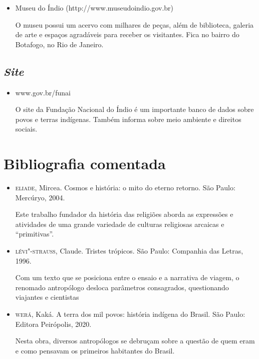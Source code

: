 \documentclass[12pt]{extarticle}
\begin{document}
\begin{itemize}
\item Museu do Índio (http://www.museudoindio.gov.br)

O museu possui um acervo com milhares de peças, além de biblioteca,
galeria de arte e espaços agradáveis para receber os visitantes. Fica no
bairro do Botafogo, no Rio de Janeiro.
\end{itemize}

\subsection{\emph{Site}}

\begin{itemize}
\item www.gov.br/funai

O site da Fundação Nacional do Índio é um importante banco de dados
sobre povos e terras indígenas. Também informa sobre meio ambiente e
direitos sociais.
\end{itemize}

\section{Bibliografia comentada}

\begin{itemize}
\item\textsc{eliade}, Mircea. Cosmos e história: o mito do eterno retorno. São Paulo: Mercúryo, 2004.

Este trabalho fundador da história das religiões aborda as expressões e
atividades de uma grande variedade de culturas religiosas arcaicas e
``primitivas''.

\item\textsc{lévi"-strauss}, Claude. Tristes trópicos. São Paulo: Companhia das Letras, 1996.

Com um texto que se posiciona entre o ensaio e a narrativa de viagem, o
renomado antropólogo desloca parâmetros consagrados, questionando
viajantes e cientistas

\item\textsc{werá}, Kaká. A terra dos mil povos: história indígena do Brasil. São
Paulo: Editora Peirópolis, 2020.

Nesta obra, diversos antropólogos se debruçam sobre a questão de quem
eram e como pensavam os primeiros habitantes do Brasil.
\end{itemize}
\end{document}
